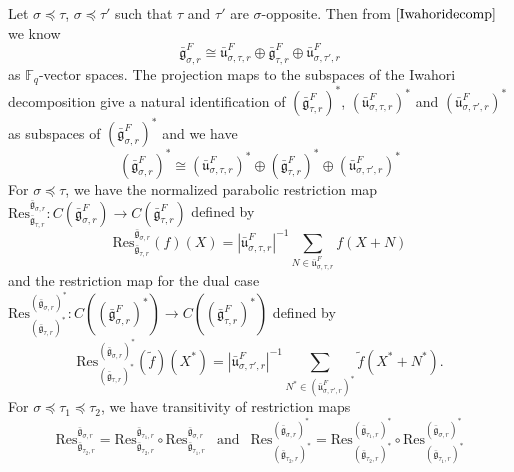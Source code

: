 \documentclass[11 pt]{article}
\numberwithin{equation}{subsection}
\theoremstyle{definition}
\theoremstyle{remark}
\theoremstyle{conjecture}
\newcommand{\bg}{\bar{\mathfrak g}}
\newcommand{\bu}{\bar{\mathfrak u}}
\newcommand{\Res}{\mathrm{Res}}
\newcommand{\F}{\mathbb F}
\begin{document}
Let $\sigma\preceq \tau $, $\sigma \preceq \tau'$ such that $\tau$ and $\tau'$ are $\sigma$-opposite. Then from $\eqref{Iwahoridecomp}$ we know 
\begin{equation}\label{Iwahorinotation}
    \bg_{\sigma,r}^F \cong \bu_{\sigma,\tau,r}^F \oplus \bg_{\tau,r}^F \oplus \bu_{\sigma,\tau',r}^F
\end{equation}
as $\F_q$-vector spaces. The projection maps to the subspaces of the Iwahori decomposition give a natural identification of $(\bg_{\tau,r}^F)^*$, $(\bu_{\sigma,\tau,r}^F)^*$ and $(\bu_{\sigma,\tau',r}^F)^*$ as subspaces of $(\bg_{\sigma,r}^F)^*$ and we have 
\begin{equation*}
    (\bg_{\sigma,r}^F)^* \cong (\bu_{\sigma,\tau,r}^F)^* \oplus (\bg_{\tau,r}^F)^* \oplus (\bu_{\sigma,\tau',r}^F)^*
\end{equation*}
For $\sigma\preceq\tau$, we have the normalized parabolic restriction map $\text{Res}^{\bg_{\sigma,r}}_{\bg_{\tau,r}}:C(\bg_{\sigma,r}^F) \rightarrow C(\bg_{\tau,r}^F)$ defined by 
\begin{equation}
    \text{Res}^{\bg_{\sigma,r}}_{\bg_{\tau,r}}(f)(X)=\left|\bu_{\sigma,\tau,r}^F\right|^{-1}\sum_{N \in \bu_{\sigma,\tau,r}^F}f(X+N)
\end{equation}
 and the restriction map for the dual case $\text{Res}^{(\bg_{\sigma,r})^*}_{(\bg_{\tau,r})^*}:C\left((\bg_{\sigma,r}^F)^*\right) \rightarrow C\left((\bg_{\tau,r}^F)^*\right)$ defined by
\begin{equation}
    \Res^{(\bg_{\sigma,r})^*}_{(\bg_{\tau,r})^*}(\tilde f)(X^*)=\left|\bu_{\sigma,\tau',r}^F\right|^{-1}\sum_{N^* \in (\bu_{\sigma,\tau',r}^F)^*}\tilde f(X^*+N^*).
\end{equation} 
 For $\sigma \preceq \tau_1 \preceq \tau_2$, we have transitivity of restriction maps 
 \begin{equation*}
     \text{Res}^{\bg_{\sigma,r}}_{\bg_{\tau_2,r}}= \text{Res}^{\bg_{\tau_1,r}}_{\bg_{\tau_2,r}}\circ \text{Res}^{\bg_{\sigma,r}}_{\bg_{\tau_1,r}} \:\:\text{  and }\:\:\text{Res}^{(\bg_{\sigma,r})^*}_{(\bg_{\tau_2,r})^*}= \text{Res}^{(\bg_{\tau_1,r})^*}_{(\bg_{\tau_2,r})^*}\circ \text{Res}^{(\bg_{\sigma,r})^*}_{(\bg_{\tau_1,r})^*}
 \end{equation*}
\end{document}
